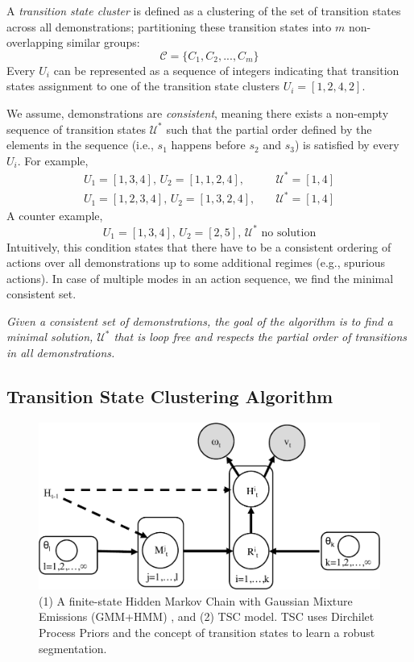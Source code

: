 A \emph{transition state cluster} is
defined as a clustering of the set of transition states across all demonstrations; partitioning these transition states into $m$ non-overlapping similar groups:
\[
\mathcal{C} = \{C_1, C_2,...,C_m\}
\]
Every $U_i$ can be represented as a sequence of integers indicating that transition states assignment to one of the transition state clusters $U_i=[1,2,4,2]$.

We assume, demonstrations are \emph{consistent}, meaning there exists a non-empty sequence of transition states $\mathcal{U}^*$ such that the partial order defined by the elements in the sequence (i.e., $s_1$ happens before $s_2$ and $s_3$) is satisfied by every $U_i$. For example,
\begin{align*} 
U_1 = [1,3,4]\text{, }U_2 = [1,1,2,4], \quad & \mathcal{U}^*=[1,4]\\ U_1 = [1,2,3,4]\text{, }U_2 = [1,3,2,4], \quad & \mathcal{U}^*=[1,4]
\end{align*}
A counter example,
\[U_1 = [1,3,4]\text{, }U_2 = [2,5]\text{, }\mathcal{U}^*\text{  no solution} \]
Intuitively, this condition states that there have to be a consistent ordering of actions over all demonstrations up to some additional regimes (e.g., spurious actions). 
In case of multiple modes in an action sequence, we find the minimal consistent set.


\noindent \emph{Given a consistent set of demonstrations, the goal of the algorithm is to find a minimal solution, $\mathcal{U}^*$ that is loop free and respects the partial order of transitions in all demonstrations.}

\subsection{Transition State Clustering Algorithm}

\begin{figure}[t!]
\centering
\includegraphics[width=\linewidth]{figures/pgm.pdf}
\caption{ (1) A finite-state Hidden Markov Chain with Gaussian Mixture Emissions (GMM+HMM) , and (2) TSC model. TSC uses Dirchilet Process Priors and the concept of transition states to learn a robust segmentation. }
\label{fig:pgm}
\vspace{-10pt}
\end{figure}


